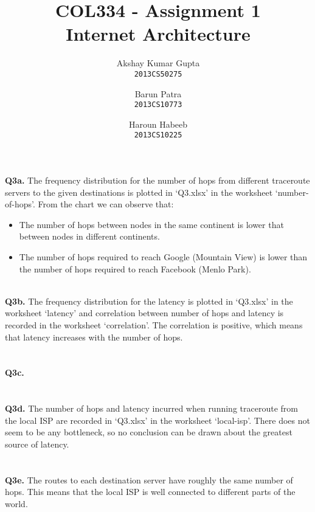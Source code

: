 \documentclass[12pt]{article}
\begin{document}
\title{COL334 - Assignment 1\\ Internet Architecture}
\author{Akshay Kumar Gupta\\\texttt{2013CS50275} \and  Barun Patra\\\texttt{2013CS10773} \and Haroun Habeeb\\\texttt{2013CS10225}}
\date{}
\maketitle
\noindent
{\bfseries Q3a.} The frequency distribution for the number of hops from different traceroute servers to the given destinations is plotted in `Q3.xlsx' in the worksheet `number-of-hops'. From the chart we can observe that:
\begin{itemize}
\item The number of hops between nodes in the same continent is lower that between nodes in different continents.
\item The number of hops required to reach Google (Mountain View) is lower than the number of hops required to reach Facebook (Menlo Park).
\end{itemize}
~ \\
{\bfseries Q3b.} The frequency distribution for the latency is plotted in `Q3.xlsx' in the worksheet `latency' and correlation between number of hops and latency is recorded in the worksheet `correlation'. The correlation is positive, which means that latency increases with the number of hops.
\\ \\ \\
{\bfseries Q3c.} 
\\ \\ \\
{\bfseries Q3d.} The number of hops and latency incurred when running traceroute from the local ISP are recorded in `Q3.xlsx' in the worksheet `local-isp'. There does not seem to be any bottleneck, so no conclusion can be drawn about the greatest source of latency.
\\ \\ \\
{\bfseries Q3e.} The routes to each destination server have roughly the same number of hops. This means that the local ISP is well connected to different parts of the world.
\end{document}
